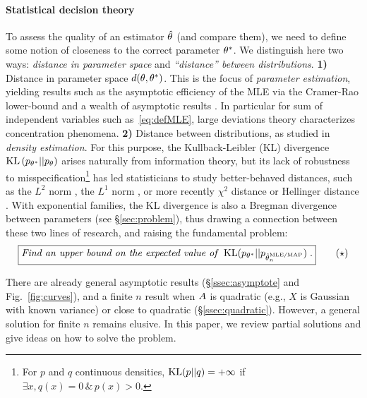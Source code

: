 \paragraph{Statistical decision theory}
To assess the quality of an estimator $\hat {\theta}$ (and compare them), we need to define some notion of closeness to the correct parameter $\theta^*$.
We distinguish here two ways: \textit{distance in parameter space} and \textit{``distance'' between distributions}.
{\bf 1)} Distance in parameter space $d(\theta,\theta^*)$. This is the focus of \emph{parameter estimation}, yielding results such as the asymptotic efficiency of the MLE via the Cramer-Rao lower-bound \citep{aitken1942estimation} and a wealth of asymptotic results \citep{vdv1998asymptotic}.
In particular for sum of independent variables such as~\eqref{eq:defMLE}, large deviations theory \citep{varadhan1984large} characterizes concentration phenomena.
{\bf 2)} Distance between distributions, as studied in \emph{density estimation}.
For this purpose, the Kullback-Leibler (KL) divergence $\mathrm{KL}\left(p_{\theta^*} || p_{\theta} \right)$  arises naturally from information theory,
but its lack of robustness to misspecification\footnote{
For $p$ and $q$ continuous densities,
$\mathrm{KL}(p||q) = +\infty$ if $\exists x, q(x)=0 \, \& \, p(x)>0$.
}
has led statisticians to study better-behaved distances, such as the $L^2$ norm \citep[\S1.2]{tsybakov2009introduction}, the $L^1$ norm \citep{devroye2001combinatorial}, 
or more recently  $\chi^2$ distance \citep{kamath2015learning} or Hellinger distance \citep{baraud2017new}.
With exponential families, the KL divergence is also a Bregman divergence between parameters (see \S\ref{sec:problem}), thus drawing a connection between these two lines of research,
and raising the fundamental problem:
\begin{equation}
\boxed{
	\textit{Find an upper bound on the expected value of}\ \ \KL(p_{\nat^*} || p_{\hat \nat_n^\text{MLE/MAP} }) \; .
}
\tag{$\star$}
\label{problem}
\end{equation}

There are already general asymptotic results (\S\ref{ssec:asymptote} and Fig.~\ref{fig:curves}), and a finite $n$ result when $A$ is quadratic (e.g., $X$ is Gaussian with known variance)
or close to quadratic (\S\ref{ssec:quadratic}).
However, a  general solution for finite $n$ remains elusive. 
In this paper, we review partial solutions and give ideas on how to solve the problem.

